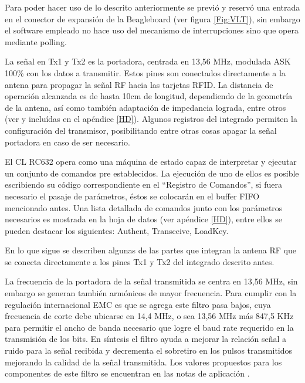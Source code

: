 Para poder hacer uso de lo descrito anteriormente se previó y reservó una entrada en el conector de expansión de la Beagleboard (ver figura \ref{Fig:VLT}), sin embargo el software empleado no hace uso del mecanismo de interrupciones sino que opera mediante polling.

\bigskip
{}

La señal en Tx1 y Tx2 es la portadora, centrada en 13,56 MHz, modulada ASK 100\% con los datos a transmitir. Estos pines son conectados directamente a la antena para propagar la señal RF hacia las tarjetas RFID. La distancia de operación alcanzada es de hasta 10cm de longitud, dependiendo de la geometría de la antena, así como también adaptación de impedancia lograda, entre otros (ver \cite{MRICF} y \cite{RFIDPA} incluídas en el apéndice \ref{HD}).
Algunos registros del integrado permiten la configuración del transmisor, posibilitando entre otras cosas apagar la señal portadora en caso de ser necesario.

\bigskip
{}

El CL RC632 opera como una máquina de estado capaz de interpretar y ejecutar un conjunto de comandos pre establecidos. La ejecución de uno de ellos es posible escribiendo su código correspondiente en el “Registro de Comandos”, si fuera necesario el pasaje de parámetros, éstos se colocarán en el buffer FIFO mencionado antes. 
Una lista detallada de comandos junto con los parámetros necesarios es mostrada en la hoja de datos (ver apéndice \ref{HD}), entre ellos se pueden destacar los siguientes: Authent, Transceive, LoadKey.

\bigskip
{}

En lo que sigue se describen algunas de las partes que integran la antena RF que se conecta directamente a los pines Tx1 y Tx2 del integrado descrito antes.

\bigskip
{}

La frecuencia de la portadora de la señal transmitida se centra en 13,56 MHz, sin embargo se generan también armónicos de mayor frecuencia. Para cumplir con la regulación internacional EMC es que se agrega este filtro pasa bajos, cuya frecuencia de corte debe ubicarse en 14,4 MHz, o sea 13,56 MHz más 847,5 KHz para permitir el ancho de banda necesario que logre el baud rate requerido en la transmisión de los bits. 
En síntesis el filtro ayuda a mejorar la relación señal a ruido para la señal recibida y decrementa el sobretiro en los pulsos transmitidos mejorando la calidad de la señal transmitida.
Los valores propuestos para los componentes de este filtro se encuentran en las notas de aplicación \cite{MRICF}.

